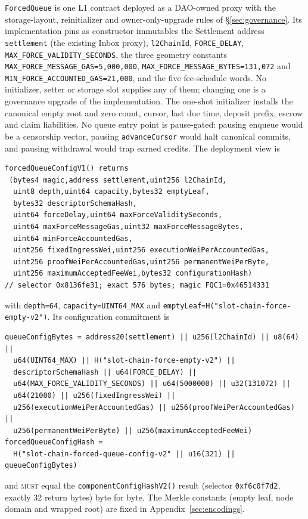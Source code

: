 \documentclass[a4paper,11pt]{article}
\newcommand{\code}[1]{\nolinkurl{#1}}
\newcommand{\must}{\textsc{must}}
\begin{document}
\code{ForcedQueue} is one L1 contract deployed as a DAO-owned proxy with the
storage-layout, reinitializer and owner-only-upgrade rules of
\S\ref{sec:governance}.  Its implementation pins as constructor immutables
the Settlement address \code{settlement} (the existing Inbox proxy),
\code{l2ChainId}, \code{FORCE_DELAY}, \code{MAX_FORCE_VALIDITY_SECONDS}, the
three geometry constants \code{MAX_FORCE_MESSAGE_GAS=5,000,000},
\code{MAX_FORCE_MESSAGE_BYTES=131,072} and
\code{MIN_FORCE_ACCOUNTED_GAS=21,000}, and the five fee-schedule words.  No
initializer, setter or storage slot supplies any of them; changing one is a
governance upgrade of the implementation.  The one-shot initializer installs
the canonical empty root and zero count, cursor, last due time, deposit
prefix, escrow and claim liabilities.  No queue entry point is pause-gated:
pausing enqueue would be a censorship vector, pausing \code{advanceCursor}
would halt canonical commits, and pausing withdrawal would trap earned
credits.  The deployment view is
\begin{verbatim}
forcedQueueConfigV1() returns
 (bytes4 magic,address settlement,uint256 l2ChainId,
  uint8 depth,uint64 capacity,bytes32 emptyLeaf,
  bytes32 descriptorSchemaHash,
  uint64 forceDelay,uint64 maxForceValiditySeconds,
  uint64 maxForceMessageGas,uint32 maxForceMessageBytes,
  uint64 minForceAccountedGas,
  uint256 fixedIngressWei,uint256 executionWeiPerAccountedGas,
  uint256 proofWeiPerAccountedGas,uint256 permanentWeiPerByte,
  uint256 maximumAcceptedFeeWei,bytes32 configurationHash)
// selector 0x8136fe31; exact 576 bytes; magic FQC1=0x46514331
\end{verbatim}
with \code{depth=64}, \code{capacity=UINT64_MAX} and
\code{emptyLeaf=H("slot-chain-force-empty-v2")}.  Its configuration
commitment is
\begin{verbatim}
queueConfigBytes = address20(settlement) || u256(l2ChainId) || u8(64) ||
  u64(UINT64_MAX) || H("slot-chain-force-empty-v2") ||
  descriptorSchemaHash || u64(FORCE_DELAY) ||
  u64(MAX_FORCE_VALIDITY_SECONDS) || u64(5000000) || u32(131072) ||
  u64(21000) || u256(fixedIngressWei) ||
  u256(executionWeiPerAccountedGas) || u256(proofWeiPerAccountedGas) ||
  u256(permanentWeiPerByte) || u256(maximumAcceptedFeeWei)
forcedQueueConfigHash =
  H("slot-chain-forced-queue-config-v2" || u16(321) || queueConfigBytes)
\end{verbatim}
and \must{} equal the \code{componentConfigHashV2()} result (selector
\code{0xf6c0f7d2}, exactly 32 return bytes) byte for byte.  The Merkle
constants (empty leaf, node domain and wrapped root) are fixed in
Appendix~\ref{sec:encodings}.
\end{document}
